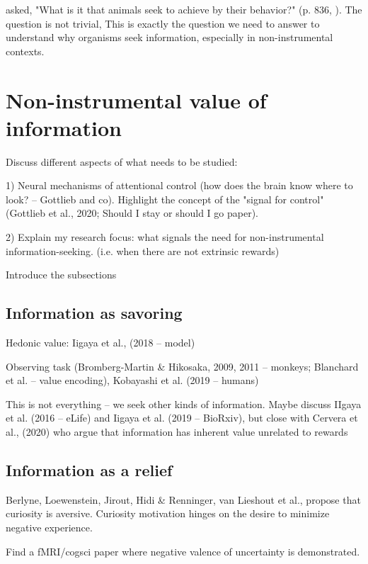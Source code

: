 \citeauthor{juechems_where_2019} asked, "What is it that animals seek to achieve by their behavior?" (p. 836, \cite{juechems_where_2019}). The question is not trivial, This is exactly the question we need to answer to understand why organisms seek information, especially in non-instrumental contexts. 

\section{Non-instrumental value of information}

    Discuss different aspects of what needs to be studied: 
    
    1) Neural mechanisms of attentional control (how does the brain know where to look? -- Gottlieb and co). Highlight the concept of the "signal for control" (Gottlieb et al., 2020; Should I stay or should I go paper).

    2) Explain my research focus: what signals the need for non-instrumental information-seeking. (i.e. when there are not extrinsic rewards)

    Introduce the subsections

    \subsection{Information as savoring}

        Hedonic value: Iigaya et al., (2018 -- model) 
            
        Observing task (Bromberg-Martin & Hikosaka, 2009, 2011 -- monkeys; Blanchard et al. -- value encoding), Kobayashi et al. (2019 -- humans)

        This is not everything -- we seek other kinds of information. Maybe discuss IIgaya et al. (2016 -- eLife) and Iigaya et al. (2019 -- BioRxiv), but close with Cervera et al., (2020) who argue that information has inherent value unrelated to rewards

    \subsection{Information as a relief}

        Berlyne, Loewenstein, Jirout, Hidi & Renninger, van Lieshout et al., propose that curiosity is aversive. Curiosity motivation hinges on the desire to minimize negative experience.

        Find a fMRI/cogsci paper where negative valence of uncertainty is demonstrated.

